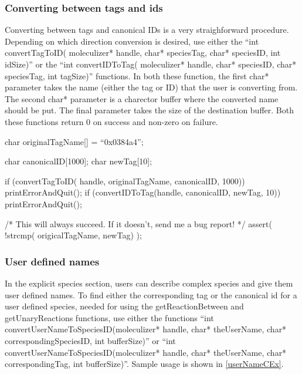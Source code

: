\subsubsection{Converting between tags and ids}
Converting between tags and canonical IDs is a very straighforward
procedure.  Depending on which direction conversion is desired, use
either the ``int convertTagToID( moleculizer* handle, char*
speciesTag, char* speciesID, int idSize)'' or the ``int
convertIDToTag( moleculizer* handle, char* speciesID, char*
speciesTag, int tagSize)'' functions.  In both these function, the
first char* parameter takes the name (either the tag or ID) that the
user is converting from.  The second char* parameter is a charector
buffer where the converted name should be put.  The final parameter
takes the size of the destination buffer.  Both these functions return
0 on success and non-zero on failure.  

\begin{ExampleC}

char originalTagName[] = ``0x0384a4'';

char canonicalID[1000];
char newTag[10];

if (convertTagToID( handle, originalTagName, canonicalID, 1000)) printErrorAndQuit();
if (convertIDToTag(handle, canonicalID, newTag, 10)) printErrorAndQuit();

/* This will always succeed.  If it doesn't, send me a bug report! */
assert( !strcmp( origicalTagName, newTag) );

\end{ExampleC}

\subsubsection{User defined names}

In the explicit species section, users can describe complex species
and give them user defined names.  To find either the corresponding
tag or the canonical id for a user defined species, needed for using
the getReactionBetween and getUnaryReactions functions, use either the
functions ``int convertUserNameToSpeciesID(moleculizer* handle, char*
theUserName, char* correspondingSpeciesID, int bufferSize)'' or ``int
convertUserNameToSpeciesID(moleculizer* handle, char* theUserName,
char* correspondingTag, int bufferSize)''. Sample usage is shown in
\ref{userNameCEx}. 

